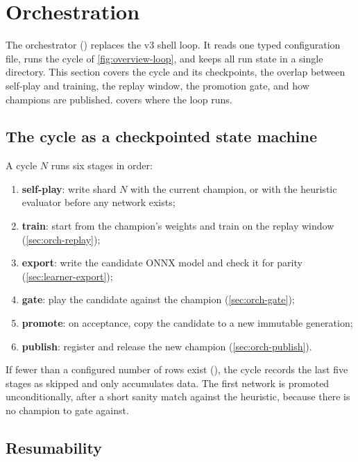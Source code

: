 \section{Orchestration}
\label{sec:orchestration}

The orchestrator () replaces the v3 shell loop. It
reads one typed configuration file, runs the cycle of \cref{fig:overview-loop}, and keeps
all run state in a single directory. This section covers the cycle and its checkpoints,
the overlap between self-play and training, the replay window, the promotion gate, and
how champions are published.  covers where the loop runs.

\subsection{The cycle as a checkpointed state machine}
\label{sec:orch-cycle}

A cycle $N$ runs six stages in order:
\begin{enumerate}
  \item \textbf{self-play}: write shard $N$ with the current champion, or with the
        heuristic evaluator before any network exists;
  \item \textbf{train}: start from the champion's weights and train on the replay window
        (\cref{sec:orch-replay});
  \item \textbf{export}: write the candidate ONNX model and check it for parity
        (\cref{sec:learner-export});
  \item \textbf{gate}: play the candidate against the champion (\cref{sec:orch-gate});
  \item \textbf{promote}: on acceptance, copy the candidate to a new immutable generation;
  \item \textbf{publish}: register and release the new champion (\cref{sec:orch-publish}).
\end{enumerate}
If fewer than a configured number of rows exist (), the cycle
records the last five stages as skipped and only accumulates data. The first network is
promoted unconditionally, after a short sanity match against the heuristic, because there
is no champion to gate against.

\subsection{Resumability}
\label{sec:orch-resume}

